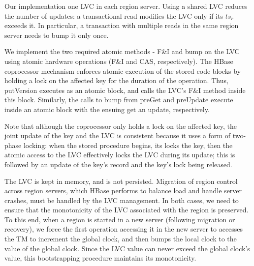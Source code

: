 Our implementation  one LVC in each region server. 
Using a shared LVC reduces the number of updates:  
a transactional read modifies the LVC only if its $ts_r$ exceeds it. In particular, 
a transaction with multiple reads in the same region server needs to bump it only once. 

We implement the two required atomic methods - F\&I and bump on the LVC using atomic hardware operations (F\&I and CAS, respectively). 
The HBase coprocessor mechanism enforces atomic execution of the stored code blocks by holding  a lock on the affected key for the duration of the operation.
Thus, putVersion executes as an atomic block, and calls the LVC's F\&I method inside this block.
Similarly, the calls to bump from preGet and preUpdate execute inside an atomic block with the ensuing get an update, respectively. 

Note that although the coprocessor only holds a lock on the affected key, the joint update of the key and the LVC is consistent
because it uses a form of two-phase locking: when the stored procedure begins, its locks the key, then the atomic access to the LVC
effectively locks the LVC during its update; this is followed by an update of the key's record and the key's lock being released.

The LVC is kept in memory, and is not persisted. Migration of region control across region servers, which HBase performs 
to balance load and handle server crashes, must be handled by the LVC management. 
In both cases, we need to ensure that the monotonicity of the LVC associated with the %
region is preserved. To this end, when a region is started in a new server (following migration or recovery), 
we force the first operation accessing it
in the new server to accesses the TM to increment the global clock, and then 
bumps the local clock to the value of the global clock.
Since the LVC value can never exceed the global clock's value, this bootstrapping procedure maintains its monotonicity.



